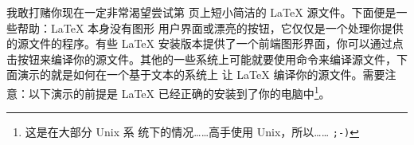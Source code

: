 
我敢打赌你现在一定非常渴望尝试第 \pageref{mini} 页上短小简洁的 \LaTeX{} 源文件。下面便是一些帮助：\LaTeX{} 本身没有图形
用户界面或漂亮的按钮，它仅仅是一个处理你提供的源文件的程序。有些 \LaTeX{} 安装版本提供了一个前端图形界面，你可以通过点
击按钮来编译你的源文件。其他的一些系统上可能就要使用命令来编译源文件，下面演示的就是如何在一个基于文本的系统上
让 \LaTeX{} 编译你的源文件。需要注意：以下演示的前提是 \LaTeX{} 已经正确的安装到了你的电脑中\footnote{这是在大部分 Unix 系
统下的情况……高手使用 Unix，所以…… \texttt{;-)}}。

%
%
%
%
%
%
%

